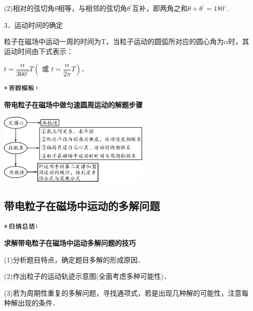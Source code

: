 (2)相对的弦切角$\theta$相等，与相邻的弦切角$\theta^\prime$互补，即两角之和$\theta+\theta^\prime=180^\circ$.

3．运动时间的确定

粒子在磁场中运动一周的时间为T，当粒子运动的圆弧所对应的圆心角为$\alpha$时，其运动时间由下式表示：

$t=\dfrac{\alpha}{360^{\circ}} T\left(\text { 或 } t=\dfrac{\alpha}{2 \pi} T\right)$．

\begin{center}\includegraphics[width=0.70764in,height=0.12292in]{media/image25.png}\end{center}
\begin{center}
	\textbf{带电粒子在磁场中做匀速圆周运动的解题步骤}
\end{center}

\begin{center}\includegraphics[width=2.90556in,height=1.36806in]{media/image355.png}\end{center}

\subsection{带电粒子在磁场中运动的多解问题}

\begin{center}\includegraphics[width=0.70764in,height=0.12292in]{media/image13.png}\end{center}
\begin{center}
	\textbf{求解带电粒子在磁场中运动多解问题的技巧}
\end{center}

(1)分析题目特点，确定题目多解的形成原因．

(2)作出粒子的运动轨迹示意图(全面考虑多种可能性)．

(3)若为周期性重复的多解问题，寻找通项式，若是出现几种解的可能性，注意每种解出现的条件．

